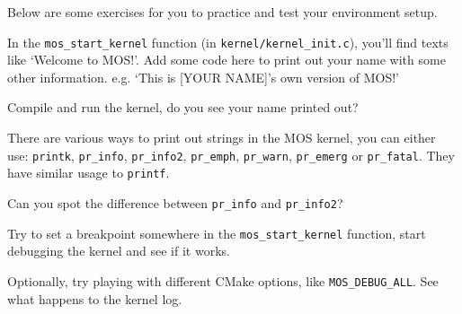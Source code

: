 Below are some exercises for you to practice and test your environment setup.

\begin{exercise}
    \item In the \texttt{mos\_start\_kernel} function (in \texttt{kernel/kernel\_init.c}), you'll find
    texts like `Welcome to MOS!'. Add some code here to print out your name with some other information.
    e.g. `This is [YOUR NAME]'s own version of MOS!'

    Compile and run the kernel, do you see your name printed out?

    \begin{tip}
        \item There are various ways to print out strings in the MOS kernel, you can either use:
        \texttt{printk}, \texttt{pr\_info}, \texttt{pr\_info2}, \texttt{pr\_emph}, \texttt{pr\_warn},
        \texttt{pr\_emerg} or \texttt{pr\_fatal}. They have similar usage to \texttt{printf}.
        \item Can you spot the difference between \texttt{pr\_info} and \texttt{pr\_info2}?
    \end{tip}

    \item Try to set a breakpoint somewhere in the \texttt{mos\_start\_kernel} function, start debugging
    the kernel and see if it works.

    \item Optionally, try playing with different CMake options, like \texttt{MOS\_DEBUG\_ALL}. See what happens to the
    kernel log.
\end{exercise}
